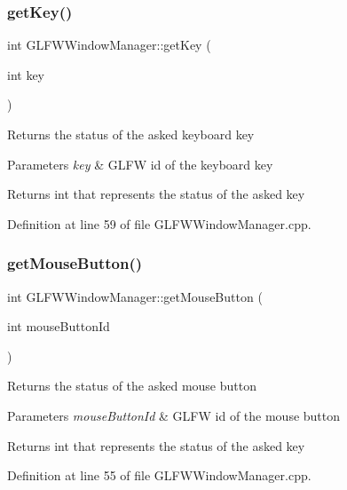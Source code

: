 \subsubsection{\texorpdfstring{get\+Key()}{getKey()}}
{\footnotesize\ttfamily int G\+L\+F\+W\+Window\+Manager\+::get\+Key (\begin{DoxyParamCaption}\item[{int}]{key }\end{DoxyParamCaption})}

Returns the status of the asked keyboard key 
\begin{DoxyParams}{Parameters}
{\em key} & G\+L\+FW id of the keyboard key \\
\hline
\end{DoxyParams}
\begin{DoxyReturn}{Returns}
int that represents the status of the asked key 
\end{DoxyReturn}


Definition at line 59 of file G\+L\+F\+W\+Window\+Manager.\+cpp.

\mbox{\label{class_g_l_f_w_window_manager_aee22f247d0e79d1f51a4eed39b0b90e6}} 
\subsubsection{\texorpdfstring{get\+Mouse\+Button()}{getMouseButton()}}
{\footnotesize\ttfamily int G\+L\+F\+W\+Window\+Manager\+::get\+Mouse\+Button (\begin{DoxyParamCaption}\item[{int}]{mouse\+Button\+Id }\end{DoxyParamCaption})}

Returns the status of the asked mouse button 
\begin{DoxyParams}{Parameters}
{\em mouse\+Button\+Id} & G\+L\+FW id of the mouse button \\
\hline
\end{DoxyParams}
\begin{DoxyReturn}{Returns}
int that represents the status of the asked key 
\end{DoxyReturn}


Definition at line 55 of file G\+L\+F\+W\+Window\+Manager.\+cpp.

